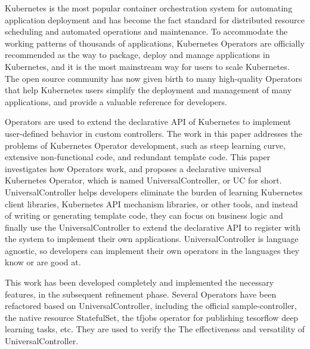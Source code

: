 \documentclass[macfonts,master]{njuthesis}
\begin{document}
\begin{englishabstract}
Kubernetes is the most popular container orchestration system for automating application deployment and has become the fact standard for distributed resource scheduling and automated operations and maintenance. To accommodate the working patterns of thousands of applications, Kubernetes Operators are officially recommended as the way to package, deploy and manage applications in Kubernetes, and it is the most mainstream way for users to scale Kubernetes. The open source community has now given birth to many high-quality Operators that help Kubernetes users simplify the deployment and management of many applications, and provide a valuable reference for developers.

Operators are used to extend the declarative API of Kubernetes to implement user-defined behavior in custom controllers. The work in this paper addresses the problems of Kubernetes Operator development, such as steep learning curve, extensive non-functional code, and redundant template code. This paper investigates how Operators work, and proposes a declarative universal Kubernetes Operator, which is named UniversalController, or UC for short. UniversalController helps developers eliminate the burden of learning Kubernetes client libraries, Kubernetes API mechanism libraries, or other tools, and instead of writing or generating template code, they can focus on business logic and finally use the UniversalController to extend the declarative API to register with the system to implement their own applications. UniversalController is language agnostic, so developers can implement their own operators in the languages they know or are good at.

This work has been developed completely and implemented the necessary features, in the subsequent refinement phase. Several Operators have been refactored based on UniversalController, including the official sample-controller, the native resource StatefulSet, the tfjobs operator for publishing tesorflow deep learning tasks, etc. They are used to verify the The effectiveness and versatility of UniversalController.

\end{englishabstract}

\tableofcontents
\end{document}
